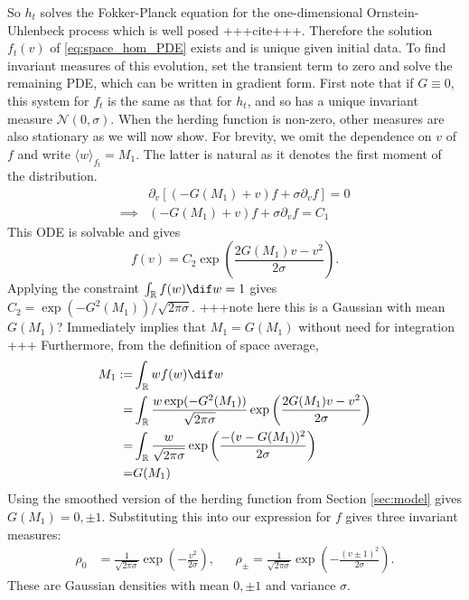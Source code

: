 \documentclass[11pt, a4paper, draft]{article}
\renewcommand{\R}{\mathbb{R}}
\begin{document}
        So $h_t$ solves the Fokker-Planck equation for the one-dimensional Ornstein-Uhlenbeck process which is well posed +++cite+++. Therefore the solution $f_t(v)$ of \eqref{eq:space_hom_PDE} exists and is unique given initial data. To find invariant measures of this evolution, set the transient term to zero and solve the remaining PDE, which can be written in gradient form. First note that if $G\equiv 0$, this system for $f_t$ is the same as that for $h_t$, and so has a unique invariant measure $\mathcal{N}(0,\sigma)$. When the herding function is non-zero, other measures are also stationary as we will now show. For brevity, we omit the dependence on $v$ of $f$ and write $\langle w \rangle_{f_t} = M_1$. The latter is natural as it denotes the first moment of the distribution.
        \begin{align*}
            &\partial_v\left[(-G(M_1) +v) f + \sigma \partial_v f \right] = 0\\
            \implies& (-G(M_1) +v) f + \sigma \partial_v f = C_1
        \end{align*}
        This ODE is solvable and gives 
        \[
            f(v) = C_2\exp\left(\frac{2G(M_1)v - v^2}{2\sigma} \right). 
        \]
        Applying the constraint $\int_\R f(w)\dif w = 1$ gives $C_2 = \exp(-G^2(M_1))/\sqrt{2\pi\sigma}$. +++note here this is a Gaussian with mean $G(M_1)$? Immediately implies that $M_1 = G(M_1)$ without need for integration +++ Furthermore, from the definition of space average,
        \begin{align*}
            M_1 :=& \int_\R wf(w) \dif w\\ 
            =& \int_\R \frac{w\exp(-G^2(M_1))}{\sqrt{2\pi\sigma}} \exp\left(\frac{2G(M_1)v - v^2}{2\sigma} \right)\\ 
            =& \int_\R \frac{w}{\sqrt{2\pi\sigma}} \exp\left(\frac{ - (v-G(M_1))^2}{2\sigma} \right)\\
            =& G(M_1)
        \end{align*}
        Using the smoothed version of the herding function from Section \ref{sec:model} gives $G(M_1) = 0, \pm 1$. Substituting this into our expression for $f$ gives three invariant measures:
        \begin{align*}
            \rho_0 &= \frac{1}{\sqrt{2\pi\sigma}}\exp\left(-\frac{v^2}{2\sigma} \right), && \rho_{\pm} = \frac{1}{\sqrt{2\pi\sigma}}\exp\left(-\frac{(v\pm 1)^2}{2\sigma}\right).
        \end{align*}
        These are Gaussian densities with mean $0, \pm 1$ and variance $\sigma$.
        
\end{document}
